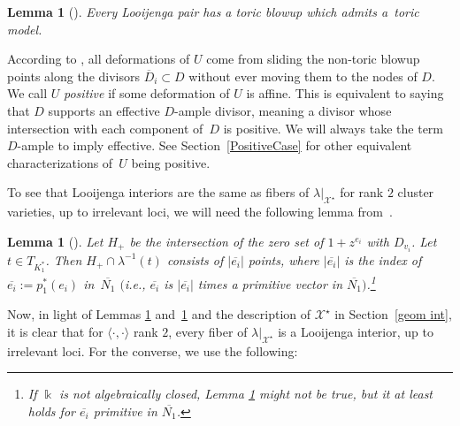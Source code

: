 \documentclass[10pt,a4paper]{amsart}
\numberwithin{equation}{section}
\numberwithin{figure}{section}
\numberwithin{table}{section}
\let\?=\overline
\let\s=\mathcal
\newcommand {\kk} {\Bbbk}
\newtheorem{lem}[thm]{Lemma}
\theoremstyle{definition}
\begin{document}
\begin{lem}[{\cite[Proposition~1.19]{GHK1}}]\label{ToricModel} Every Looijenga pair has a toric blowup which admits a~toric model.
\end{lem}

According to \cite{GHK2}, all deformations of $U$ come from sliding the non-toric blowup points along the divisors $\?{D}_i\subset D$ without ever moving them to the nodes of $D$. We call $U$ {\it positive} if some deformation of $U$ is affine. This is equivalent to saying that $D$ supports an effective $D$-ample divisor, meaning a divisor whose intersection with each component of~$D$ is positive. We will always take the term $D$-ample to imply effective. See Section~\ref{PositiveCase} for other equivalent characterizations of~$U$ being positive.

To see that Looijenga interiors are the same as fibers of $\lambda|_{\s{X}^{\star}}$ for rank $2$ cluster varieties, up to irrelevant loci, we will need the following lemma from~\cite{GHK3}.

\begin{lem}[{\cite[Lemma 5.1]{GHK3}}]\label{Fibers}
Let $H_+$ be the intersection of the zero set of $1+z^{e_i}$ with $D_{v_i}$. Let $t\in T_{K_1^*}$. Then $H_+\cap \lambda^{-1}(t)$ consists of $|\?{e_i}|$ points, where $|\?{e_i}|$ is the index of $\?{e_i}:=p_1^*(e_i)$ in~$\?{N_1}$ $($i.e., $\?{e_i}$ is $|\?{e_i}|$ times a primitive vector in $\?{N_1})$.\footnote{If $\kk$ is not algebraically closed, Lemma \ref{Fibers} might not be true, but it at least holds for $\?{e_i}$ primitive in $\?{N_1}$.}
\end{lem}

Now, in light of Lemmas \ref{ToricModel} and~\ref{Fibers} and the description of $\s{X}^{\star}$ in Section~\ref{geom int}, it is clear that for $\langle \cdot,\cdot \rangle$ rank $2$, every fiber of $\lambda|_{\s{X}^{\star}}$ is a Looijenga interior, up to irrelevant loci. For the converse, we use the following:
\end{document}
